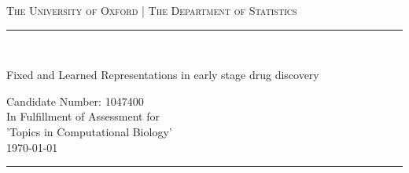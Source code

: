 \begin{titlingpage}
\begin{center}
		
		
		
		
		
		\textsc{\centering The University of Oxford | The Department of Statistics}\\[0.2cm]
		
		\newcommand{\HRule}{\rule{\linewidth}{0.5mm}}
		
		
		\begin{flushright}
			\HRule \\[.05cm]
		{  \huge \sc Fixed and Learned Representations in early stage drug discovery\par }
		\vspace*{.6cm}
		{\Large \sc Candidate Number: 1047400}\\[0.6cm]
		{\large In Fulfillment of Assessment for \\ 'Topics in Computational Biology'}\\[0.2cm]
		{\today}\\[.05cm]
		\HRule \\[0.4cm]
		\end{flushright}
		
	\end{center}
\begin{abstract}
	\noindent
Der Abstract fasst die zentralen Inhalte der Arbeit zusammen. Eine Wertung oder Interpretation erfolgt nicht. Dies hilft, sich einen groben Überblick über Fragestellung, Vorgehen und Ergebnisse zu verschaffen. Bestandteil sollen die Teile a) Hintergrundinformationen, Fragestellung, Zielsetzung, Forschungskontext, b) Methoden, c) Ergebnisse und d) Schlussfolgerungen, Anwendungsmöglichkeiten sein. Der Text ist knapp, vollständig und präzise, zudem objektiv und ohne persönliche Wertung. Achten Sie auf eine einfache und verständliche Sprache. Alle genannten Inhalte müssen auch im Hauptteil aufgegriffen werden. Den Inhalt objektiv und ohne persönliche Wertung wiedergeben. Gehen Sie auf die wichtigsten Konzepte, Resultate oder Folgerungen ein. Verwenden Sie keine Zitate und verzichten Sie auf Abkürzungen. In der Regel sind ca. 200 Wörter ausreichend.
\end{abstract}
\tableofcontents
\end{titlingpage}



\setcounter{tocdepth}{2}

